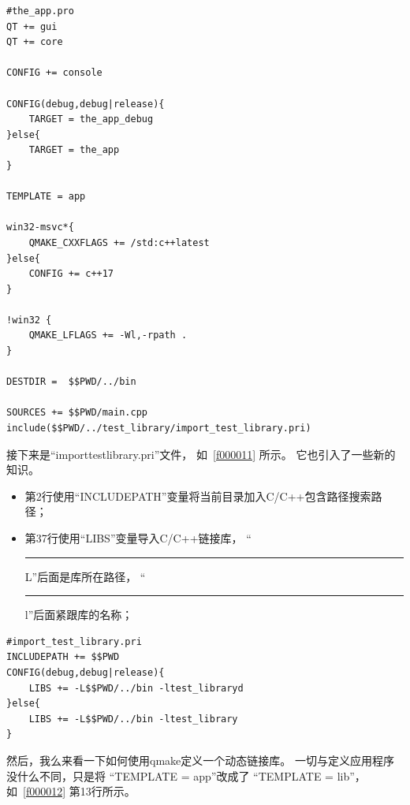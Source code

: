 \FloatBarrier
\begin{lstlisting}[label=f000016,
caption=GoodLuck,
title=\lstlistingname\ \thelstlisting
]
#the_app.pro
QT += gui
QT += core

CONFIG += console

CONFIG(debug,debug|release){
    TARGET = the_app_debug
}else{
    TARGET = the_app
}

TEMPLATE = app

win32-msvc*{
    QMAKE_CXXFLAGS += /std:c++latest
}else{
    CONFIG += c++17
}

!win32 {
    QMAKE_LFLAGS += -Wl,-rpath .
}

DESTDIR =  $$PWD/../bin

SOURCES += $$PWD/main.cpp
include($$PWD/../test_library/import_test_library.pri)
\end{lstlisting}          %


接下来是“import\underline{\hspace{0.5em}}test\underline{\hspace{0.5em}}library.pri”文件，
如\lstlistingname\ \ref{f000011} 所示。
它也引入了一些新的知识。
\begin{itemize}
\item 第2行使用“INCLUDEPATH”变量将当前目录加入C/C{\sourcefonttwo{}+}{\sourcefonttwo{}+}包含路径搜索路径；
\item 第3\raisebox{0.16ex}{\sourcefonttwo\~{}}7行使用“LIBS”变量导入C/C{\sourcefonttwo{}+}{\sourcefonttwo{}+}链接库，
“\hspace{0.05em}\rule[0.7ex]{0.4em}{0.65pt}\hspace{0.05em}L”后面是库所在路径，
“\hspace{0.05em}\rule[0.7ex]{0.4em}{0.65pt}\hspace{0.05em}l”后面紧跟库的名称；
\end{itemize}
\FloatBarrier
\begin{lstlisting}[label=f000011,
caption=GoodLuck,
title=\lstlistingname\ \thelstlisting
]
#import_test_library.pri
INCLUDEPATH += $$PWD
CONFIG(debug,debug|release){
    LIBS += -L$$PWD/../bin -ltest_libraryd
}else{
    LIBS += -L$$PWD/../bin -ltest_library
}
\end{lstlisting}          %


然后，我么来看一下如何使用qmake定义一个动态链接库。
一切与定义应用程序没什么不同，只是将
“TEMPLATE {\sourcefonttwo{}=} app”改成了
“TEMPLATE {\sourcefonttwo{}=} lib”，如\lstlistingname\ \ref{f000012} 第13行所示。

